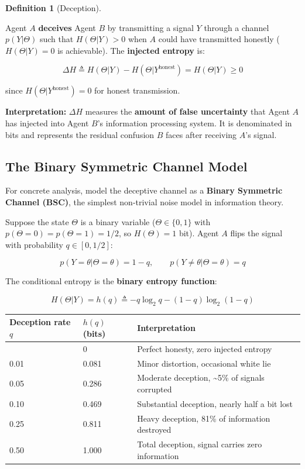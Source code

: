 \documentclass[11pt]{article}
\theoremstyle{plain}
\theoremstyle{definition}
\newtheorem{definition}{Definition}
\theoremstyle{remark}
\newcounter{none}
\let\origsubsection\subsection
\renewcommand{\subsection}{\needspace{7\baselineskip}\origsubsection}
\begin{document}
\begin{definition}[Deception]
\label{def-deception}

Agent $A$ \textbf{deceives} Agent $B$ by transmitting a signal $Y$ through a channel $p(Y | \Theta)$ such that $H(\Theta | Y) > 0$ when $A$ could have transmitted honestly ($H(\Theta | Y) = 0$ is achievable). The \textbf{injected entropy} is:

$$\Delta H \triangleq H(\Theta | Y) - H(\Theta | Y^{\text{honest}}) = H(\Theta | Y) \geq 0$$

since $H(\Theta | Y^{\text{honest}}) = 0$ for honest transmission.
\end{definition}

\textbf{Interpretation:} \(\Delta H\) measures the \textbf{amount of
false uncertainty} that Agent \(A\) has injected into Agent \(B\)'s
information processing system. It is denominated in bits and represents
the residual confusion \(B\) faces after receiving \(A\)'s signal.

\subsection{The Binary Symmetric Channel
Model}\label{the-binary-symmetric-channel-model}

For concrete analysis, model the deceptive channel as a \textbf{Binary
Symmetric Channel (BSC)}, the simplest non-trivial noise model in
information theory.

Suppose the state \(\Theta\) is a binary variable
(\(\Theta \in \{0, 1\}\) with \(p(\Theta = 0) = p(\Theta = 1) = 1/2\),
so \(H(\Theta) = 1\) bit). Agent \(A\) flips the signal with probability
\(q \in [0, 1/2]\):

\[p(Y = \theta | \Theta = \theta) = 1 - q, \qquad p(Y \neq \theta | \Theta = \theta) = q\]

The conditional entropy is the \textbf{binary entropy function}:

\[H(\Theta | Y) = h(q) \triangleq -q \log_2 q - (1 - q) \log_2(1 - q)\]

{\def\LTcaptype{none} %
\begin{longtable}[]{@{}lll@{}}
\toprule\noalign{}
Deception rate \(q\) & \(h(q)\) (bits) & Interpretation \\
\midrule\noalign{}
\endhead
\bottomrule\noalign{}
\endlastfoot
0 & 0 & Perfect honesty, zero injected entropy \\
0.01 & 0.081 & Minor distortion, occasional white lie \\
0.05 & 0.286 & Moderate deception, \textasciitilde5\% of signals
corrupted \\
0.10 & 0.469 & Substantial deception, nearly half a bit lost \\
0.25 & 0.811 & Heavy deception, 81\% of information destroyed \\
0.50 & 1.000 & Total deception, signal carries zero information \\
\end{longtable}
}
\end{document}

